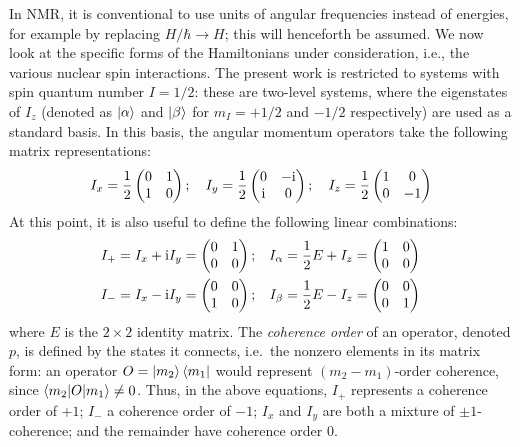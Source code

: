 In NMR, it is conventional to use units of angular frequencies instead of energies, for example by replacing $H/\hbar \to H$; this will henceforth be assumed.
We now look at the specific forms of the Hamiltonians under consideration, i.e., the various nuclear spin interactions.
The present work is restricted to systems with spin quantum number $I = 1/2$: these are two-level systems, where the eigenstates of $I_z$ (denoted as $\ket{\alpha}$ and $\ket{\beta}$ for $m_I = +1/2$ and $-1/2$ respectively) are used as a standard basis.
In this basis, the angular momentum operators take the following matrix representations:
\begin{equation}
    \label{eq:pauli}
    I_x = \frac{1}{2}\begin{pmatrix} 0 & 1 \\ 1 & 0 \end{pmatrix}; \quad 
    I_y = \frac{1}{2}\begin{pmatrix} 0 & -\mathrm{i} \\ \mathrm{i} & 0 \end{pmatrix}; \quad 
    I_z = \frac{1}{2}\begin{pmatrix} 1 & 0 \\ 0 & -1 \end{pmatrix}
\end{equation}
At this point, it is also useful to define the following linear combinations:
\begin{equation}
    \label{eq:other_single_spin_ops}
    \begin{aligned}
        I_+ = I_x + \mathrm{i} I_y &= \begin{pmatrix} 0 & 1 \\ 0 & 0 \end{pmatrix}; &
        I_\alpha = \frac{1}{2}E + I_z &= \begin{pmatrix} 1 & 0 \\ 0 & 0 \end{pmatrix} \\
        I_- = I_x - \mathrm{i} I_y &= \begin{pmatrix} 0 & 0 \\ 1 & 0 \end{pmatrix}; &
        I_\beta = \frac{1}{2}E - I_z &= \begin{pmatrix} 0 & 0 \\ 0 & 1 \end{pmatrix}
    \end{aligned}
\end{equation}
where $E$ is the $2 \times 2$ identity matrix.
The \textit{coherence order} of an operator, denoted $p$, is defined by the states it connects, i.e.\ the nonzero elements in its matrix form: an operator $O = \ket{m_2}\bra{m_1}$ would represent $(m_2 - m_1)$-order coherence, since $\braket{m_2|O|m_1} \neq 0$.
Thus, in the above equations, $I_+$ represents a coherence order of $+1$; $I_-$ a coherence order of $-1$; $I_x$ and $I_y$ are both a mixture of $\pm 1$-coherence; and the remainder have coherence order $0$.

